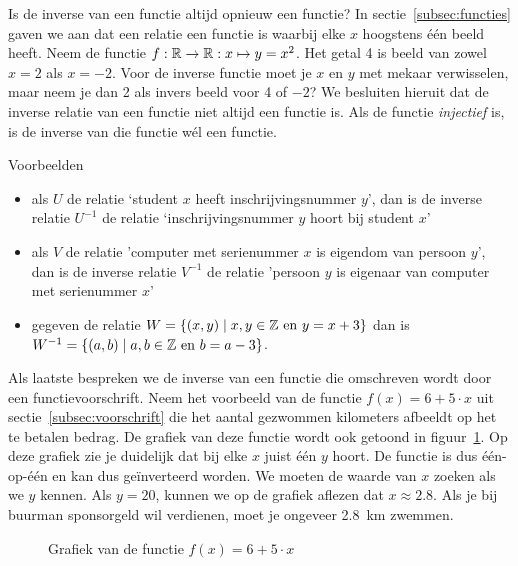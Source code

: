 Is de inverse van een functie altijd opnieuw een functie?  In sectie~\ref{subsec:functies} gaven we aan dat een relatie een functie is waarbij elke $x$ hoogstens één beeld heeft. Neem de functie $f:\mathbb{R}\to\mathbb{R}:x\mapsto y= x^2$. Het getal \num{4} is beeld van zowel $x=2$ als $x=-2$. Voor de inverse functie moet je $x$ en $y$ met mekaar verwisselen, maar neem je dan 2 als invers beeld voor 4 of $-2$? We besluiten hieruit dat de inverse relatie van een functie niet altijd een functie is. Als de functie \emph{injectief} is, is de inverse van die functie wél een functie. 

Voorbeelden
\begin{itemize}
\item als $U$ de relatie `student $x$ heeft inschrijvingsnummer $y$', dan is de inverse relatie $U^{-1}$ de relatie `inschrijvingsnummer $y$ hoort bij student $x$'
\item als $V$ de relatie 'computer met serienummer $x$ is eigendom van persoon $y$', dan is de inverse relatie $V^{-1}$ de relatie 'persoon $y$ is eigenaar van computer met serienummer $x$'
\item gegeven de relatie $W=\{(x,y)\mid x,y\in \mathbb{Z} \mathrm{~en~} y=x+3\}$ dan is $W^{-1}=\{(a,b)\mid a,b\in \mathbb{Z} \mathrm{~en~} b=a-3\}$.
\end{itemize}




Als laatste bespreken we de inverse van een functie die omschreven wordt door een functievoorschrift. 
Neem het voorbeeld van de functie $f(x)=6+5\cdot x$ uit sectie~\ref{subsec:voorschrift} die het aantal gezwommen kilometers afbeeldt op het te betalen bedrag. De grafiek van deze functie wordt ook getoond in figuur~\ref{fig:fotos}. Op deze grafiek zie je duidelijk dat bij elke $x$ juist \'e\'en $y$ hoort. De functie is dus \'e\'en-op-\'e\'en en kan dus ge\"inverteerd worden. We moeten  de waarde van $x$ zoeken als we $y$ kennen. Als $y=20$, kunnen we op de grafiek aflezen dat $x\approx \num{2.8}$. Als je bij buurman  sponsorgeld wil verdienen, moet je ongeveer \SI{2.8}{\kilo\meter} zwemmen. 

\begin{figure}[htbp]
\centering
{}
\caption{Grafiek van de functie $f(x)=6+5\cdot x$ }
\label{fig:fotos}
\end{figure}

